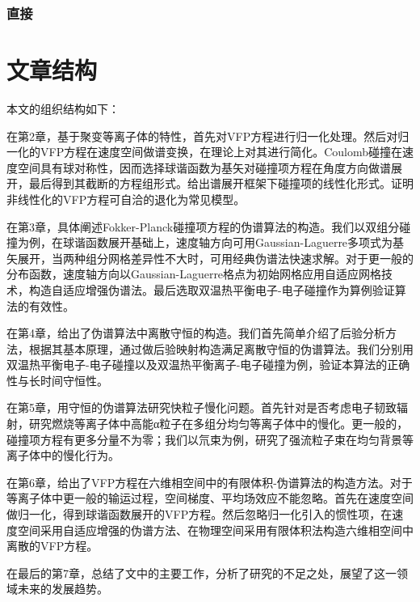 \subsubsection{直接}
\label{直接}



\section{文章结构}

  本文的组织结构如下：

在第2章，基于聚变等离子体的特性，首先对VFP方程进行归一化处理。然后对归一化的VFP方程在速度空间做谱变换，在理论上对其进行简化。Coulomb碰撞在速度空间具有球对称性，因而选择球谐函数为基矢对碰撞项方程在角度方向做谱展开，最后得到其截断的方程组形式。给出谱展开框架下碰撞项的线性化形式。证明非线性化的VFP方程可自洽的退化为常见模型。

在第3章，具体阐述Fokker-Planck碰撞项方程的伪谱算法的构造。我们以双组分碰撞为例，在球谐函数展开基础上，速度轴方向可用Gaussian-Laguerre多项式为基矢展开，当两种组分网格差异性不大时，可用经典伪谱法快速求解。对于更一般的分布函数，速度轴方向以Gaussian-Laguerre格点为初始网格应用自适应网格技术，构造自适应增强伪谱法。最后选取双温热平衡电子-电子碰撞作为算例验证算法的有效性。

在第4章，给出了伪谱算法中离散守恒的构造。我们首先简单介绍了后验分析方法，根据其基本原理，通过做后验映射构造满足离散守恒的伪谱算法。我们分别用双温热平衡电子-电子碰撞以及双温热平衡离子-电子碰撞为例，验证本算法的正确性与长时间守恒性。

在第5章，用守恒的伪谱算法研究快粒子慢化问题。首先针对是否考虑电子韧致辐射，研究燃烧等离子体中高能α粒子在多组分均匀等离子体中的慢化。更一般的，碰撞项方程有更多分量不为零；我们以氘束为例，研究了强流粒子束在均匀背景等离子体中的慢化行为。

在第6章，给出了VFP方程在六维相空间中的有限体积-伪谱算法的构造方法。对于等离子体中更一般的输运过程，空间梯度、平均场效应不能忽略。首先在速度空间做归一化，得到球谐函数展开的VFP方程。然后忽略归一化引入的惯性项，在速度空间采用自适应增强的伪谱方法、在物理空间采用有限体积法构造六维相空间中离散的VFP方程。

在最后的第7章，总结了文中的主要工作，分析了研究的不足之处，展望了这一领域未来的发展趋势。


